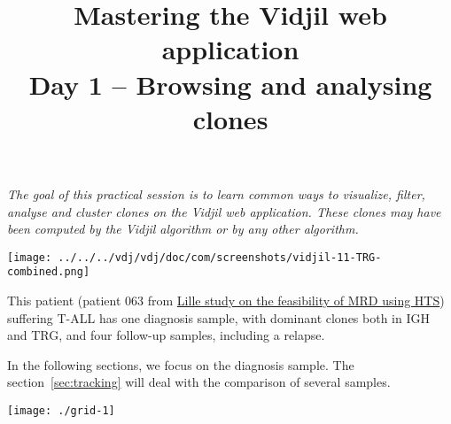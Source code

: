 \documentclass[11pt]{article}
\title{Mastering the Vidjil web application \\ Day 1 -- Browsing and analysing clones
}
\begin{document}
\maketitle

\textit{The goal of this practical session is to learn
common ways to visualize, filter, analyse and cluster clones
on the Vidjil web application.
%
These clones may have been computed by the Vidjil algorithm
or by any other algorithm.}

\bigskip


\centerline{\texttt{[image: ../../../vdj/vdj/doc/com/screenshots/vidjil-11-TRG-combined.png]}}

\bigskip



This patient (patient 063 from \href{http://dx.doi.org/10.1016/j.leukres.2016.11com.009}{Lille study on the feasibility of MRD using HTS}) suffering T-ALL has one diagnosis sample,
with dominant clones both in IGH and TRG,
and four follow-up samples, including a relapse.


In the following sections, we focus on the diagnosis sample.
The section~\ref{sec:tracking} will deal with the comparison of several samples. 







\bigskip

\bigskip

\centerline{\texttt{[image: ./grid-1]}}
\end{document}
